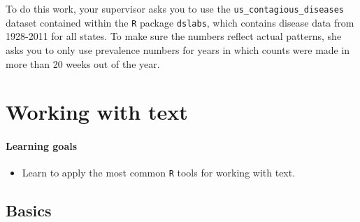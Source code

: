 \documentclass[
]{book}
\providecommand{\tightlist}{%
  \setlength{\itemsep}{0pt}\setlength{\parskip}{0pt}}
\begin{document}
To do this work, your supervisor asks you to use the \texttt{us\_contagious\_diseases} dataset contained within the \texttt{R} package \texttt{dslabs}, which contains disease data from 1928-2011 for all states. To make sure the numbers reflect actual patterns, she asks you to only use prevalence numbers for years in which counts were made in more than 20 weeks out of the year.

\hypertarget{text}{%
\chapter{Working with text}\label{text}}

\hypertarget{learning-goals-18}{%
\subsubsection*{Learning goals}\label{learning-goals-18}}

\begin{itemize}
\tightlist
\item
  Learn to apply the most common \texttt{R} tools for working with text.
\end{itemize}

\hypertarget{basics-1}{%
\section*{Basics}\label{basics-1}}
\end{document}
